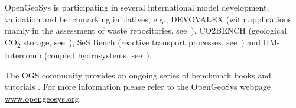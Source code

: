 OpenGeoSys is participating in several international model development, validation and benchmarking initiatives, e.g., DEVOVALEX (with applications mainly in the assessment of waste repositories, see~\cite{Birkholzer2018}), CO2BENCH (geological CO\textsubscript{2} storage, see~\cite{Kolditz2012613}), SeS Bench (reactive transport processes, see~\cite{Steefel:2015}) and HM-Intercomp (coupled hydrosystems, see~\cite{Maxwell:2015}).

The OGS community provides an ongoing series of benchmark books \cite{BB4} and tutorials \cite{Lehmann:2018}. For more information please refer to the OpenGeoSys webpage \url{www.opengeosys.org}.
